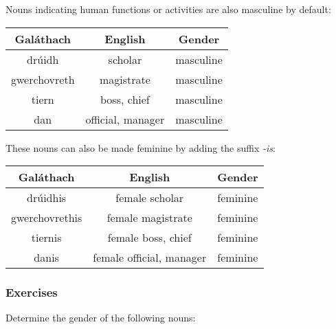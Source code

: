 Nouns indicating human functions or activities are also masculine by default:
\begin{table}[H]
\centering
\begin{tabu}{c|c|c}
  \textbf{Gal\'{a}thach} & \textbf{English} & \textbf{Gender}\\
  \toprule
  dr\'{u}idh & scholar & masculine\\
  gwerchovreth & magistrate & masculine\\
  tiern & boss, chief & masculine\\
  dan & official, manager & masculine
\end{tabu}
\label{example_gender_human_functions}
\end{table}

These nouns can also be made feminine by adding the suffix \textit{-is}:
\begin{table}[H]
\centering
\begin{tabu}{c|c|c}
  \textbf{Gal\'{a}thach} & \textbf{English} & \textbf{Gender}\\
  \toprule
  dr\'{u}idhis & female scholar & feminine\\
  gwerchovrethis & female magistrate & feminine\\
  tiernis & female boss, chief & feminine\\
  danis & female official, manager & feminine
\end{tabu}
\label{example_gender_human_functions_femalize}
\end{table}

\subsubsection{Exercises}

Determine the gender of the following nouns:

